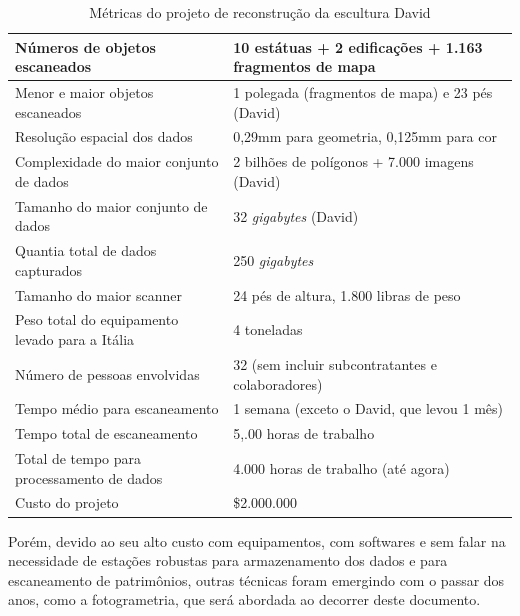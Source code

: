 \begin{table}
\caption{Métricas do projeto de reconstrução da escultura David}
\label{tab:metricasDavid}
\begin{tabular}{|l|p{4.7cm}|}
\hline
Números de objetos escaneados          & 10 estátuas + 2 edificações + 1.163 fragmentos de mapa  \\ \hline
Menor e maior objetos escaneados       & 1 polegada (fragmentos de mapa) e 23 pés (David)         \\ \hline
Resolução espacial dos dados                & 0,29mm para geometria, 0,125mm para cor              \\ \hline
Complexidade do maior conjunto de dados             & 2 bilhões de polígonos + 7.000 imagens (David)\\ \hline
Tamanho do maior conjunto de dados                    & 32 \emph{gigabytes} (David)                  \\ \hline
Quantia total de dados capturados              & 250 \emph{gigabytes}                                 \\ \hline
Tamanho do maior scanner                    & 24 pés de altura, 1.800 libras de peso                  \\ \hline
Peso total do equipamento levado para a Itália & 4 toneladas                                              \\ \hline
Número de pessoas envolvidas                  & 32 (sem incluir subcontratantes e colaboradores) \\ \hline
Tempo médio para escaneamento              & 1 semana (exceto o David, que levou 1 mês)       \\ \hline
Tempo total de escaneamento                 & 5,.00 horas de trabalho                                   \\ \hline
Total de tempo para processamento de dados          & 4.000 horas de trabalho (até agora)                            \\ \hline
Custo do projeto                          & \$2.000.000                                         \\ \hline
\end{tabular}
\end{table}


Porém, devido ao seu alto custo com equipamentos, com softwares e sem falar na necessidade de estações robustas para armazenamento dos dados e para escaneamento de patrimônios, outras técnicas foram emergindo com o passar dos anos, como a fotogrametria, que será abordada ao decorrer deste documento.

% 